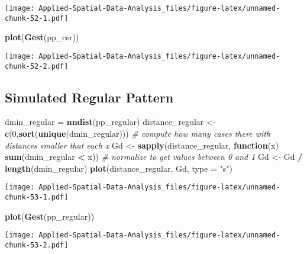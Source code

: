\documentclass[
]{book}
\newenvironment{Shaded}{\begin{snugshade}}{\end{snugshade}}
\newcommand{\CommentTok}[1]{\textcolor[rgb]{0.56,0.35,0.01}{\textit{#1}}}
\newcommand{\ControlFlowTok}[1]{\textcolor[rgb]{0.13,0.29,0.53}{\textbf{#1}}}
\newcommand{\DataTypeTok}[1]{\textcolor[rgb]{0.13,0.29,0.53}{#1}}
\newcommand{\DecValTok}[1]{\textcolor[rgb]{0.00,0.00,0.81}{#1}}
\newcommand{\KeywordTok}[1]{\textcolor[rgb]{0.13,0.29,0.53}{\textbf{#1}}}
\newcommand{\NormalTok}[1]{#1}
\newcommand{\OperatorTok}[1]{\textcolor[rgb]{0.81,0.36,0.00}{\textbf{#1}}}
\newcommand{\StringTok}[1]{\textcolor[rgb]{0.31,0.60,0.02}{#1}}
\begin{document}
\texttt{[image: Applied-Spatial-Data-Analysis\_files/figure-latex/unnamed-chunk-52-1.pdf]}

\begin{Shaded}
\begin{Highlighting}[]
\KeywordTok{plot}\NormalTok{(}\KeywordTok{Gest}\NormalTok{(pp_csr))}
\end{Highlighting}
\end{Shaded}

\texttt{[image: Applied-Spatial-Data-Analysis\_files/figure-latex/unnamed-chunk-52-2.pdf]}

\hypertarget{simulated-regular-pattern-2}{%
\subsection{Simulated Regular Pattern}\label{simulated-regular-pattern-2}}

\begin{Shaded}
\begin{Highlighting}[]
\NormalTok{dmin_regular =}\StringTok{ }\KeywordTok{nndist}\NormalTok{(pp_regular)}
\NormalTok{distance_regular <-}\StringTok{ }\KeywordTok{c}\NormalTok{(}\DecValTok{0}\NormalTok{,}\KeywordTok{sort}\NormalTok{(}\KeywordTok{unique}\NormalTok{(dmin_regular)))}
\CommentTok{# compute how many cases there with distances smaller that each x}
\NormalTok{Gd <-}\StringTok{ }\KeywordTok{sapply}\NormalTok{(distance_regular, }\ControlFlowTok{function}\NormalTok{(x) }\KeywordTok{sum}\NormalTok{(dmin_regular }\OperatorTok{<}\StringTok{ }\NormalTok{x))}
\CommentTok{# normalize to get values between 0 and 1}
\NormalTok{Gd <-}\StringTok{ }\NormalTok{Gd }\OperatorTok{/}\StringTok{ }\KeywordTok{length}\NormalTok{(dmin_regular)}
\KeywordTok{plot}\NormalTok{(distance_regular, Gd, }\DataTypeTok{type =} \StringTok{"s"}\NormalTok{)}
\end{Highlighting}
\end{Shaded}

\texttt{[image: Applied-Spatial-Data-Analysis\_files/figure-latex/unnamed-chunk-53-1.pdf]}

\begin{Shaded}
\begin{Highlighting}[]
\KeywordTok{plot}\NormalTok{(}\KeywordTok{Gest}\NormalTok{(pp_regular))}
\end{Highlighting}
\end{Shaded}

\texttt{[image: Applied-Spatial-Data-Analysis\_files/figure-latex/unnamed-chunk-53-2.pdf]}
\end{document}

